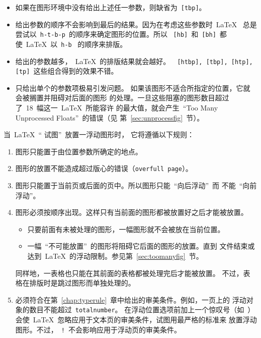 \begin{itemize}
	\item 如果在图形环境中没有给出上述任一参数，则缺省为~\texttt{[tbp]}。
	\item 给出参数的顺序不会影响到最后的结果。因为在考虑这些参数时~\LaTeX{}~
	总是尝试以~\texttt{h-t-b-p}~的顺序来确定图形的位置。所以
	~\texttt{[hb]}~和~\texttt{[bh]}~都使~\LaTeX{}~以~\texttt{h-b}~
	的顺序来排版。
	\item 给出的参数越多，~\LaTeX{}~的排版结果就会越好。~\texttt{
		[htbp], [tbp], [htp], [tp]}~这些组合得到的效果不错。
	\item 只给出单个的参数项极易引发问题。
	如果该图形不适合所指定的位置，它就会被搁置并阻碍对后面的图形
	的处理。一旦这些阻塞的图形数目超过了~18~幅这一~\LaTeX{}~所能容许
	的最大值，就会产生~``Too Many Unprocessed Floats''~的错误（见
	第~\ref{sec:unprocessfig}~节）。
\end{itemize}

当~\LaTeX{}~``{ 试图}''~放置一浮动图形时，
它将遵循以下规则：
\begin{enumerate}
	\item 图形只能置于由位置参数所确定的地点。
	\item 图形的放置不能造成超过版心的错误（\texttt{overfull page}）。
	\item 图形只能置于当前页或后面的页中。所以图形只能~``向后浮动''~而
	不能~``向前浮动''。
	\item 图形必须按顺序出现。这样只有当前面的图形都被放置好之后才能被放置。
	\begin{itemize}
		\item 只要前面有未被处理的图形，一幅图形就不会被放在当前位置。
		\item 一幅~``不可能放置''~的图形将阻碍它后面的图形的放置。直到
		文件结束或达到~\LaTeX{}~的浮动限制。参见第~\ref{sec:toomanyfig}~节。
	\end{itemize}
	同样地，一表格也只能在其前面的表格都被处理完后才能被放置。
	不过，表格在排版时是跳过图形而单独处理的。
	\item 必须符合在第~\ref{chap:typerule}~章中给出的审美条件。例如，一页上的
	浮动对象的数目不能超过~\texttt{totalnumber}。
	在浮动位置选项前加上一个惊叹号（如~）
	会使~\LaTeX{}~忽略应用于文本页的审美条件，试图用最严格的标准来
	放置浮动图形。不过，~\texttt{!}~不会影响应用于浮动页的审美条件。
\end{enumerate}

